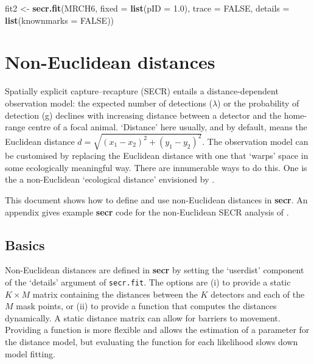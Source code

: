 \documentclass[
]{book}
\newenvironment{Shaded}{\begin{snugshade}}{\end{snugshade}}
\newcommand{\AttributeTok}[1]{\textcolor[rgb]{0.13,0.29,0.53}{#1}}
\newcommand{\ConstantTok}[1]{\textcolor[rgb]{0.56,0.35,0.01}{#1}}
\newcommand{\FloatTok}[1]{\textcolor[rgb]{0.00,0.00,0.81}{#1}}
\newcommand{\FunctionTok}[1]{\textcolor[rgb]{0.13,0.29,0.53}{\textbf{#1}}}
\newcommand{\NormalTok}[1]{#1}
\newcommand{\OtherTok}[1]{\textcolor[rgb]{0.56,0.35,0.01}{#1}}
\begin{document}
\begin{Shaded}
\begin{Highlighting}[]
\NormalTok{fit2 }\OtherTok{\textless{}{-}} \FunctionTok{secr.fit}\NormalTok{(MRCH6, }\AttributeTok{fixed =} \FunctionTok{list}\NormalTok{(}\AttributeTok{pID =} \FloatTok{1.0}\NormalTok{), }\AttributeTok{trace =} \ConstantTok{FALSE}\NormalTok{,}
                 \AttributeTok{details =} \FunctionTok{list}\NormalTok{(}\AttributeTok{knownmarks =} \ConstantTok{FALSE}\NormalTok{))}
\end{Highlighting}
\end{Shaded}

\chapter{Non-Euclidean distances}\label{Noneuclidean}


Spatially explicit capture--recapture (SECR) entails a distance-dependent observation model: the expected number of
detections (\(\lambda\)) or the probability of detection (g) declines with increasing distance between a detector and the home-range centre of a focal animal. `Distance' here usually, and by default, means the Euclidean distance \(d = \sqrt{(x_1-x_2)^2 + (y_1 - y_2)^2}\). The observation model can be customised by replacing the Euclidean distance with one that `warps' space in some ecologically meaningful way. There are innumerable ways to do this. One is the a non-Euclidean
`ecological distance' envisioned by \citet{rcgg13}.

This document shows how to define and use non-Euclidean distances in \textbf{secr}. An appendix gives example \textbf{secr} code for the non-Euclidean SECR analysis of \citet{sfr15}.

\section{Basics}\label{basics}

Non-Euclidean distances are defined in \textbf{secr} by setting the `userdist' component of the `details' argument of \texttt{secr.fit}. The options are (i) to provide a static \(K \times M\) matrix containing the distances between the \(K\) detectors and each of the \(M\) mask points, or (ii) to provide a function that computes the distances dynamically. A static distance matrix can allow for barriers to movement. Providing a function is more flexible and allows the estimation of a parameter
for the distance model, but evaluating the function for each likelihood slows down model fitting.
\end{document}
